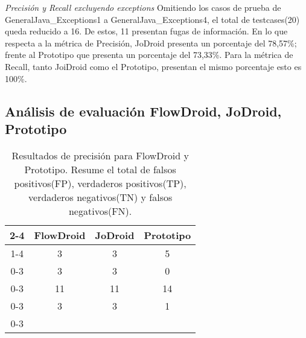 \textit{Precisión y Recall excluyendo exceptions}\newline
Omitiendo los casos de prueba de GeneralJava\_Exceptions1 a
GeneralJava\_Exceptions4, el total de testcases(20) queda reducido a 16. De
estos, 11 presentan fugas de información.\newline
En lo que respecta a la métrica de Precisión, JoDroid
presenta un porcentaje del 78,57\%; frente al Prototipo que presenta un
porcentaje del 73,33\%.\newline 
Para la métrica de Recall, tanto JoiDroid como el Prototipo, presentan el mismo
porcentaje esto es 100\%.\newline



\subsection{Análisis de evaluación FlowDroid, JoDroid, Prototipo}
\label{subsec:fjp}

\begin{table}[h]
\begin{center}
\begin{tabular}{c|c|c|c|}
\cline{2-4}
& \cellcolor{gray!30}FlowDroid & \cellcolor{gray!30}JoDroid &
\cellcolor{gray!30}Prototipo \\
\cline{1-4}
\multicolumn{0}{ |c|  }{\multirow{0}{*}{FP} }  & 3 & 3 & 5\\ \cline{0-3}
\multicolumn{0}{ |c|  }{\multirow{0}{*}{FN} }  & 3 & 3 & 0\\ \cline{0-3}
\multicolumn{0}{ |c|  }{\multirow{0}{*}{TP} }  & 11 & 11 & 14\\\cline{0-3}
\multicolumn{0}{ |c|  }{\multirow{0}{*}{TN} }  & 3 & 3 &  1\\ \cline{0-3}
\end{tabular}
\end{center}
\caption{Resultados de precisión para FlowDroid y Prototipo. Resume el total de
falsos positivos(FP), verdaderos positivos(TP), verdaderos negativos(TN) y
falsos negativos(FN).}
\label{tb:porcentajes}
\end{table}

